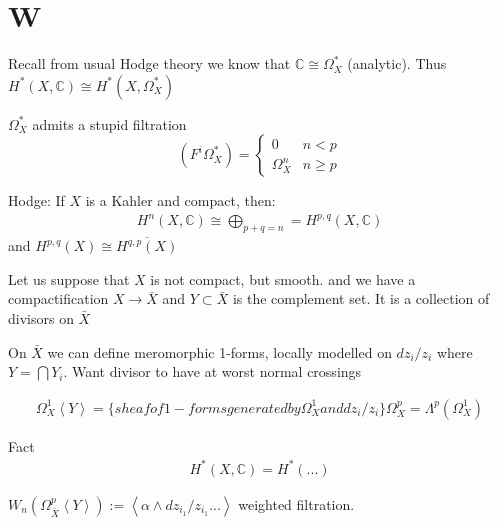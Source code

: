 


\section{W} %

Recall from usual Hodge theory we know that $ \mathbb{C} \cong \Omega_X ^* $ (analytic). 
Thus $H^*(X, \mathbb{C} ) \cong H^* ( X, \Omega_X ^* ) $ 

$\Omega_X ^ * $ admits a stupid filtration 
\begin{equation}
    (F^i \Omega_X ^* ) = \begin{cases} 
        0 & n<p \\
        \Omega_X ^n & n \geq p 
    \end{cases} 
\end{equation}

Hodge: If $ X$ is a Kahler and compact, then: 
\begin{align}
    H^n ( X, \mathbb{C} ) \cong \bigoplus_{p+q = n } = H^{p,q} ( X, \mathbb{C} ) 
\end{align}
and $ H^{p,q} ( X) \cong \overline{ H^{q,p} ( X) } $  

Let us suppose that $ X$ is not compact, but smooth. 
and we have a compactification $ X \rightarrow \bar{X} $ 
and $Y \subset \bar{X} $ is the complement set. 
It is a collection of divisors on $\bar{X} $ 

On $ \bar{X} $ we can define meromorphic 1-forms,
locally modelled on $ dz_i/z_i $ where $ Y = \bigcap Y_i $. 
Want divisor to have at worst normal crossings 

\begin{definition}
    \begin{align}
        \Omega_X ^ 1 \left< Y \right> = \{ sheaf of 1-forms generated by \Omega_X ^1 and dz_i / z_i \}
        \Omega_X ^p = \Lambda ^p ( \Omega_X ^1 ) 
    \end{align}


\end{definition}

Fact 
\begin{align}
    H^*  ( X, \mathbb{C}  ) = H^*  ( ...) 
\end{align}

\begin{definition}
    $W_n ( \Omega_\bar{X} ^p \left<Y \right> ) := \left< \alpha \wedge dz_{i_1} / z_{i_1} ... \right> $ 
    weighted filtration. 
\end{definition}

